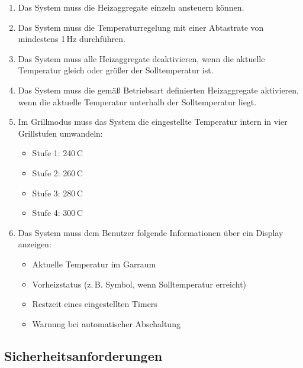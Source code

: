 \documentclass[a4paper,12pt]{article}
\begin{document}
\begin{enumerate}[label=\textbf{R-1.\arabic*}, ref=R-1.\arabic*, itemsep=0pt, topsep=0pt, font=\bfseries]
\begin{itemize}
        \item Heißluft: Ringheizkörper hinten + Ventilator
    \end{itemize}
    \item \label{req:1.7} Das System muss die Heizaggregate einzeln ansteuern können.
    \item \label{req:1.8} Das System muss die Temperaturregelung mit einer Abtastrate von mindestens 1\,Hz durchführen.
    \item \label{req:1.9} Das System muss alle Heizaggregate deaktivieren, wenn die aktuelle Temperatur gleich oder größer der Solltemperatur ist.
    \item \label{req:1.10} Das System muss die gemäß Betriebsart definierten Heizaggregate aktivieren, wenn die aktuelle Temperatur unterhalb der Solltemperatur liegt.
    \item \label{req:1.11} Im Grillmodus muss das System die eingestellte Temperatur intern in vier Grillstufen umwandeln:
    \begin{itemize}
        \item Stufe 1: 240\,\textdegree{}C
        \item Stufe 2: 260\,\textdegree{}C
        \item Stufe 3: 280\,\textdegree{}C
        \item Stufe 4: 300\,\textdegree{}C
    \end{itemize}
    \item \label{req:1.12} Das System muss dem Benutzer folgende Informationen über ein Display anzeigen:
    \begin{itemize}
        \item Aktuelle Temperatur im Garraum
        \item Vorheizstatus (z.\,B. Symbol, wenn Solltemperatur erreicht)
        \item Restzeit eines eingestellten Timers
        \item Warnung bei automatischer Abschaltung
    \end{itemize}
\end{enumerate}

\subsection{Sicherheitsanforderungen}
\end{document}
